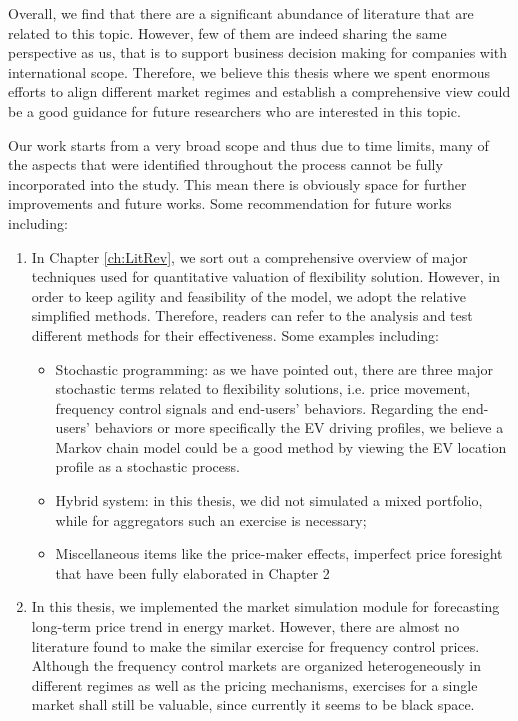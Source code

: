 Overall, we find that there are a significant abundance of literature that are related to this topic. However, few of them are indeed sharing the same perspective as us, that is to support business decision making for companies with international scope. Therefore, we believe this thesis where we spent enormous efforts to align different market regimes and establish a comprehensive view could be a good guidance for future researchers who are interested in this topic. 

Our work starts from a very broad scope and thus due to time limits, many of the aspects that were identified throughout the process cannot be fully incorporated into the study. This mean there is obviously space for further improvements and future works. Some recommendation for future works including:

\begin{enumerate}
	\item In Chapter \ref{ch:LitRev}, we sort out a comprehensive overview of major techniques used for quantitative valuation of flexibility solution. However, in order to keep agility and feasibility of the model, we adopt the relative simplified methods. Therefore, readers can refer to the analysis and test different methods for their effectiveness. Some examples including:
	\begin{itemize}
		\item Stochastic programming: as we have pointed out, there are three major stochastic terms related to flexibility solutions, i.e. price movement, frequency control signals and end-users' behaviors. Regarding the end-users' behaviors or more specifically the EV driving profiles, we believe a Markov chain model could be a good method by viewing the EV location profile as a stochastic process.
		\item Hybrid system: in this thesis, we did not simulated a mixed portfolio, while for aggregators such an exercise is necessary;
		\item Miscellaneous items like the price-maker effects, imperfect price foresight that have been fully elaborated in Chapter 2
	\end{itemize} 
	\item In this thesis, we implemented the market simulation module for forecasting long-term price trend in energy market. However, there are almost no literature found to make the similar exercise for frequency control prices. Although the frequency control markets are organized heterogeneously in different regimes as well as the pricing mechanisms, exercises for a single market shall still be valuable, since currently it seems to be black space.

\end{enumerate}
